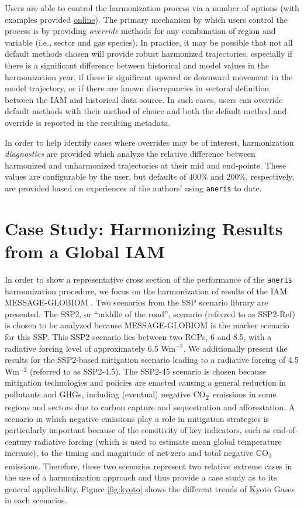 \documentclass[review]{elsarticle}
\newcommand{\code}[1]{\lstinline[basicstyle=\ttfamily\color{black}]|#1|}
\newcommand{\cotwo}{CO\textsubscript{2}~}
\begin{document}
Users are able to control the harmonization process via a number of options
(with examples provided
\href{http://mattgidden.com/aneris/config.html}{online}). The primary mechanism
by which users control the process is by providing \textit{override} methods for
any combination of region and variable (i.e., sector and gas species).  In
practice, it may be possible that not all default methods chosen will provide
robust harmonized trajectories, especially if there is a significant difference
between historical and model values in the harmonization year, if there is
significant upward or downward movement in the model trajectory, or if there are
known discrepancies in sectoral definition between the IAM and historical data
source. In such cases, users can override default methods with their method of
choice and both the default method and override is reported in the resulting
metadata.

In order to help identify cases where overrides may be of interest,
harmonization \textit{diagnostics} are provided which analyze the relative
difference between harmonized and unharmonized trajectories at their mid and
end-points. These values are configurable by the user, but defaults of $400$\%
and $200$\%, respectively, are provided based on experiences of the authors'
using \code{aneris} to date.

\section{Case Study: Harmonizing Results from a Global IAM}\label{sec:results}

In order to show a representative cross section of the performance of the
\code{aneris} harmonization procedure, we focus on the harmonization of results
of the IAM MESSAGE-GLOBIOM \cite{fricko_marker_2017}. Two scenarios from the SSP
scenario library \cite{Riahi2017153,Rao2017346} are presented. The SSP2, or
``middle of the road'', scenario (referred to as SSP2-Ref) is chosen to be
analyzed because MESSAGE-GLOBIOM is the marker scenario for this SSP. This SSP2
scenario lies between two RCPs, 6 and 8.5, with a radiative forcing level of
approximately 6.5 Wm$^{-2}$. We additionally present the results for the
SSP2-based mitigation scenario leading to a radiative forcing of 4.5 Wm$^{-2}$
(referred to as SSP2-4.5). The SSP2-45 scenario is chosen because mitigation
technologies and policies are enacted causing a general reduction in pollutants
and GHGs, including (eventual) negative \cotwo emissions in some regions and
sectors due to carbon capture and sequestration and afforestation. A scenario in
which negative emissions play a role in mitigation strategies is particularly
important because of the sensitivity of key indicators, such as end-of-century
radiative forcing (which is used to estimate mean global temperature increase),
to the timing and magnitude of net-zero and total negative \cotwo
emissions. Therefore, these two scenarios represent two relative extreme cases
in the use of a harmonization approach and thus provide a case study as to its
general applicability. Figure \ref{fig:kyoto} shows the different trends of
Kyoto Gases in each scenarios.
\end{document}

